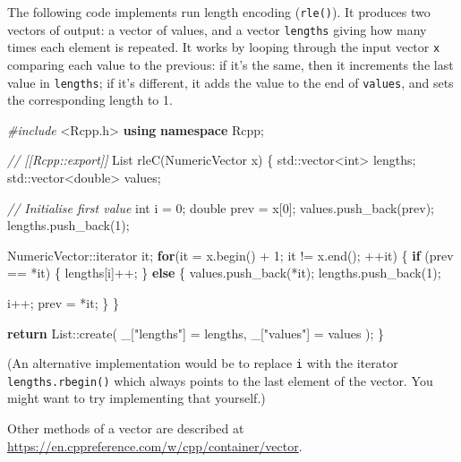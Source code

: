 \documentclass[]{book}
\newenvironment{Shaded}{\begin{snugshade}}{\end{snugshade}}
\newcommand{\BuiltInTok}[1]{#1}
\newcommand{\CommentTok}[1]{\textcolor[rgb]{0.37,0.37,0.37}{\textit{#1}}}
\newcommand{\ControlFlowTok}[1]{\textcolor[rgb]{0.27,0.27,0.27}{\textbf{#1}}}
\newcommand{\DataTypeTok}[1]{\textcolor[rgb]{0.27,0.27,0.27}{#1}}
\newcommand{\DecValTok}[1]{\textcolor[rgb]{0.06,0.06,0.06}{#1}}
\newcommand{\ImportTok}[1]{#1}
\newcommand{\KeywordTok}[1]{\textcolor[rgb]{0.27,0.27,0.27}{\textbf{#1}}}
\newcommand{\NormalTok}[1]{#1}
\newcommand{\PreprocessorTok}[1]{\textcolor[rgb]{0.37,0.37,0.37}{\textit{#1}}}
\newcommand{\StringTok}[1]{\textcolor[rgb]{0.5,0.5,0.5}{#1}}
\begin{document}
The following code implements run length encoding (\texttt{rle()}). It produces two vectors of output: a vector of values, and a vector \texttt{lengths} giving how many times each element is repeated. It works by looping through the input vector \texttt{x} comparing each value to the previous: if it's the same, then it increments the last value in \texttt{lengths}; if it's different, it adds the value to the end of \texttt{values}, and sets the corresponding length to 1.

\begin{Shaded}
\begin{Highlighting}[]
\PreprocessorTok{#include }\ImportTok{<Rcpp.h>}
\KeywordTok{using} \KeywordTok{namespace}\NormalTok{ Rcpp;}

\CommentTok{// [[Rcpp::export]]}
\NormalTok{List rleC(NumericVector x) \{}
  \BuiltInTok{std::}\NormalTok{vector<}\DataTypeTok{int}\NormalTok{> lengths;}
  \BuiltInTok{std::}\NormalTok{vector<}\DataTypeTok{double}\NormalTok{> values;}

  \CommentTok{// Initialise first value}
  \DataTypeTok{int}\NormalTok{ i = }\DecValTok{0}\NormalTok{;}
  \DataTypeTok{double}\NormalTok{ prev = x[}\DecValTok{0}\NormalTok{];}
\NormalTok{  values.push_back(prev);}
\NormalTok{  lengths.push_back(}\DecValTok{1}\NormalTok{);}

\NormalTok{  NumericVector::iterator it;}
  \ControlFlowTok{for}\NormalTok{(it = x.begin() + }\DecValTok{1}\NormalTok{; it != x.end(); ++it) \{}
    \ControlFlowTok{if}\NormalTok{ (prev == *it) \{}
\NormalTok{      lengths[i]++;}
\NormalTok{    \} }\ControlFlowTok{else}\NormalTok{ \{}
\NormalTok{      values.push_back(*it);}
\NormalTok{      lengths.push_back(}\DecValTok{1}\NormalTok{);}

\NormalTok{      i++;}
\NormalTok{      prev = *it;}
\NormalTok{    \}}
\NormalTok{  \}}

  \ControlFlowTok{return}\NormalTok{ List::create(}
\NormalTok{    _[}\StringTok{"lengths"}\NormalTok{] = lengths, }
\NormalTok{    _[}\StringTok{"values"}\NormalTok{] = values}
\NormalTok{  );}
\NormalTok{\}}
\end{Highlighting}
\end{Shaded}

(An alternative implementation would be to replace \texttt{i} with the iterator \texttt{lengths.rbegin()} which always points to the last element of the vector. You might want to try implementing that yourself.)

Other methods of a vector are described at \url{https://en.cppreference.com/w/cpp/container/vector}.
\end{document}
